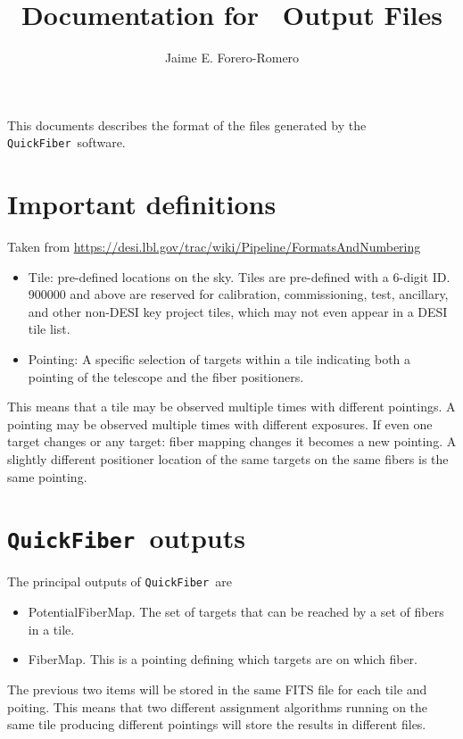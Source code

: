 \documentclass{article}
\title{Documentation for \code\ Output Files}
\author{Jaime E. Forero-Romero}
\newcommand{\code}{{\texttt{QuickFiber}}}
\begin{document}
\maketitle
\tableofcontents 

\vspace{1cm}
This documents describes the format of the files generated by the
\code\ software.  

\section{Important definitions}
Taken from \url{https://desi.lbl.gov/trac/wiki/Pipeline/FormatsAndNumbering}
\begin{itemize}

  \item Tile: pre-defined locations on the sky. Tiles are pre-defined
    with a 6-digit ID. 900000 and above are reserved for calibration,
    commissioning, test, ancillary, and other non-DESI key project
    tiles, which may not even appear in a DESI tile list.  
  \item Pointing: A specific
    selection of targets within a tile indicating both a pointing of the
    telescope and the fiber positioners.  
\end{itemize}

This means that a tile may be observed
multiple times with different pointings. A pointing may be observed
multiple times with different exposures. If even one target changes
or any target: fiber mapping changes it becomes a new pointing. A
slightly different positioner location of the same targets on the
same fibers is the same pointing.  

\section{\code\ outputs}

The principal outputs of \code\ are
\begin{itemize}
\item PotentialFiberMap. The set of targets that can be reached by a
  set of fibers in a  tile.  
\item FiberMap. This is a pointing defining which targets are on which
  fiber.
\end{itemize}

The previous two items will be stored in the same FITS file for each
tile and poiting. This means that two different assignment algorithms
running on the same tile producing different pointings will store
the results in different files. 
\end{document}
